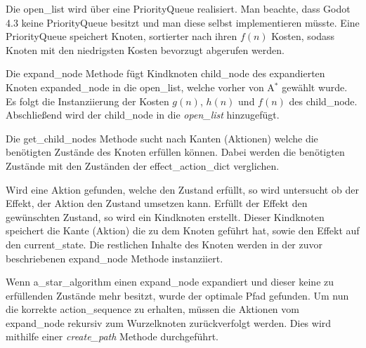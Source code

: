 Die open\_list wird über eine PriorityQueue realisiert. Man beachte, dass Godot 4.3 keine PriorityQueue besitzt und man diese selbst implementieren müsste. Eine PriorityQueue speichert Knoten, sortierter nach ihren $f(n)$ Kosten, sodass Knoten mit den niedrigsten Kosten bevorzugt abgerufen werden. 

Die expand\_node Methode fügt Kindknoten child\_node des expandierten Knoten expanded\_node in die open\_list, welche vorher von A$^*$ gewählt wurde. Es folgt die Instanziierung der Kosten $g(n)$, $h(n)$ und $f(n)$ des child\_node. Abschlie\ss{}end wird der child\_node in die \textit{open\_list} hinzugefügt.

Die get\_child\_nodes Methode sucht nach Kanten (Aktionen) welche die benötigten Zustände des Knoten erfüllen können. Dabei werden die benötigten Zustände mit den Zuständen der effect\_action\_dict verglichen.

Wird eine Aktion gefunden, welche den Zustand erfüllt, so wird untersucht ob der Effekt, der Aktion den Zustand umsetzen kann. Erfüllt der Effekt den gewünschten Zustand, so wird ein Kindknoten erstellt. Dieser Kindknoten speichert die Kante (Aktion) die zu dem Knoten geführt hat, sowie den Effekt auf den current\_state. Die restlichen Inhalte des Knoten werden in der zuvor beschriebenen expand\_node Methode instanziiert.

Wenn a\_star\_algorithm einen expand\_node expandiert und dieser keine zu erfüllenden Zustände mehr besitzt, wurde der optimale Pfad gefunden. Um nun die korrekte action\_sequence zu erhalten, müssen die Aktionen vom expand\_node rekursiv zum Wurzelknoten zurückverfolgt werden. Dies wird mithilfe einer \textit{create\_path} Methode durchgeführt.

